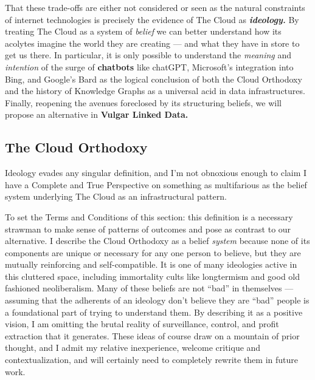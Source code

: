 \documentclass{article}
\begin{document}
That these trade-offs are either not considered or seen as the natural
constraints of internet technologies is precisely the evidence of The
Cloud as \textbf{\emph{ideology.}} By treating The Cloud as a system of
\emph{belief} we can better understand how its acolytes imagine the
world they are creating --- and what they have in store to get us there.
In particular, it is only possible to understand the \emph{meaning} and
\emph{intention} of the surge of \textbf{chatbots} like chatGPT,
Microsoft's integration into Bing, and Google's Bard as the logical
conclusion of both the Cloud Orthodoxy and the history of Knowledge
Graphs as a universal acid in data infrastructures. Finally, reopening
the avenues foreclosed by its structuring beliefs, we will propose an
alternative in \textbf{Vulgar Linked Data.}

\hypertarget{the-cloud-orthodoxy}{%
\subsection{The Cloud Orthodoxy}\label{the-cloud-orthodoxy}}

Ideology evades any singular definition, and I'm not obnoxious enough to
claim I have a Complete and True Perspective on something as
multifarious as the belief system underlying The Cloud as an
infrastructural pattern.

To set the Terms and Conditions of this section: this definition is a
necessary strawman to make sense of patterns of outcomes and pose as
contrast to our alternative. I describe the Cloud Orthodoxy as a belief
\emph{system} because none of its components are unique or necessary for
any one person to believe, but they are mutually reinforcing and
self-compatible. It is one of many ideologies active in this cluttered
space, including immortality cults like longtermism and good old
fashioned neoliberalism. Many of these beliefs are not ``bad'' in
themselves --- assuming that the adherents of an ideology don't believe
they are ``bad'' people is a foundational part of trying to understand
them. By describing it as a positive vision, I am omitting the brutal
reality of surveillance, control, and profit extraction that it
generates. These ideas of course draw on a mountain of prior
thought, and I admit my relative
inexperience, welcome critique and contextualization, and will certainly
need to completely rewrite them in future work.
\end{document}
